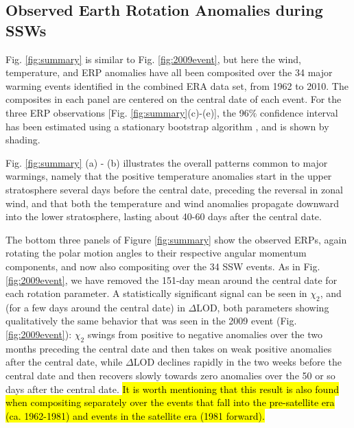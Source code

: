 \documentclass[draft,jgrga]{agutex}
\begin{document}
\begin{article}
\section{Observed Earth Rotation Anomalies during SSWs}
\label{sec:obs}

Fig. \ref{fig:summary} is similar to Fig. \ref{fig:2009event}, but here the wind, temperature, and ERP anomalies have all been composited over the 34 major warming events identified in the combined ERA data set, from 1962 to 2010.
The composites in each panel are centered on the central date of each event.
For the three ERP observations [Fig. \ref{fig:summary}(c)-(e)], the 96$\%$ confidence interval has been estimated  using a stationary bootstrap algorithm \citep{wilks1995}, and is shown by shading.

Fig. \ref{fig:summary} (a) - (b)  { illustrates the overall patterns common to major warmings, namely that the positive temperature anomalies  start in the upper stratosphere several days before the central date, preceding the reversal in zonal wind, and that both the temperature and  wind anomalies propagate downward into the lower
stratosphere, lasting about 40-60 days after the central date.}


The bottom  {three panels} of Figure \ref{fig:summary} show the observed ERPs,  {again rotating the polar motion angles to their respective angular momentum components, and now also compositing  over the 34 SSW events.}
 {As in Fig.} \ref{fig:2009event},  {we have removed the 151-day mean around the central date for each rotation parameter.}
A statistically significant signal can be seen in $\chi_2$, and  {(for a few days around the central date)} in $\Delta$LOD, both parameters showing qualitatively the same behavior that was seen in the 2009 event (Fig. \ref{fig:2009event}): $\chi_2$ swings from positive to negative anomalies over the two months preceding the central date and then takes on weak positive anomalies after the central date, while $\Delta$LOD declines rapidly in the two weeks before the central date and then recovers slowly towards zero anomalies over the 50 or so days after the central date.
\hl{It is worth mentioning that this result is also found when compositing separately over the events that fall into the pre-satellite era (ca. 1962-1981) and events in the satellite era (1981 forward).  }


\end{article}
\end{document}
